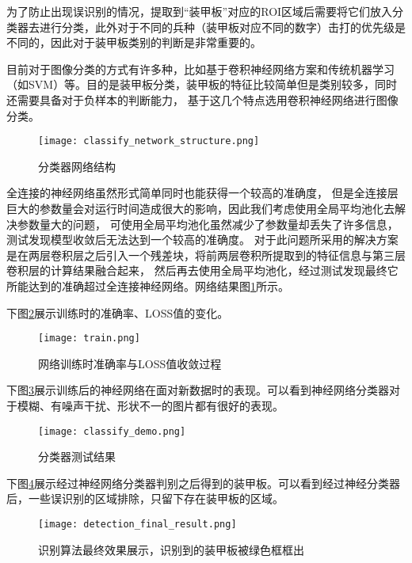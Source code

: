为了防止出现误识别的情况，提取到“装甲板”对应的ROI区域后需要将它们放入分类器去进行分类，此外对于不同的兵种（装甲板对应不同的数字）击打的优先级是不同的，因此对于装甲板类别的判断是非常重要的。\par
目前对于图像分类的方式有许多种，比如基于卷积神经网络\cite{krizhevsky2017imagenet}方案和传统机器学习（如SVM\cite{cortes1995support}）等。目的是装甲板分类，装甲板的特征比较简单但是类别较多，同时还需要具备对于负样本的判断能力，
基于这几个特点选用卷积神经网络进行图像分类。
\begin{figure}[H]
    \centering
    \texttt{[image: classify\_network\_structure.png]} 
    \caption{分类器网络结构} 
    \label{分类器网络结构}
\end{figure}
全连接的神经网络虽然形式简单同时也能获得一个较高的准确度，
但是全连接层巨大的参数量会对运行时间造成很大的影响，因此我们考虑使用全局平均池化去解决参数量大的问题，
可使用全局平均池化虽然减少了参数量却丢失了许多信息，测试发现模型收敛后无法达到一个较高的准确度。
对于此问题所采用的解决方案是在两层卷积层之后引入一个残差块\cite{he2016deep}，将前两层卷积所提取到的特征信息与第三层卷积层的计算结果融合起来，
然后再去使用全局平均池化，经过测试发现最终它所能达到的准确超过全连接神经网络。网络结果图\ref{分类器网络结构}所示。


下图\ref{网络训练时准确率与LOSS值收敛过程}展示训练时的准确率、LOSS值的变化。
\begin{figure}[H]
    \centering
    \texttt{[image: train.png]} 
    \caption{网络训练时准确率与LOSS值收敛过程} 
    \label{网络训练时准确率与LOSS值收敛过程}
\end{figure}


下图\ref{分类器测试结果}展示训练后的神经网络在面对新数据时的表现。可以看到神经网络分类器对于模糊、有噪声干扰、形状不一的图片都有很好的表现。
\begin{figure}[H]
    \centering
    \texttt{[image: classify\_demo.png]} 
    \caption{分类器测试结果} 
    \label{分类器测试结果}
\end{figure}

下图\ref{识别算法最终效果展示}展示经过神经网络分类器判别之后得到的装甲板。可以看到经过神经分类器后，一些误识别的区域排除，只留下存在装甲板的区域。
\begin{figure}[H]
    \centering
    \texttt{[image: detection\_final\_result.png]} 
    \caption{识别算法最终效果展示，识别到的装甲板被绿色框框出} 
    \label{识别算法最终效果展示}
\end{figure}

